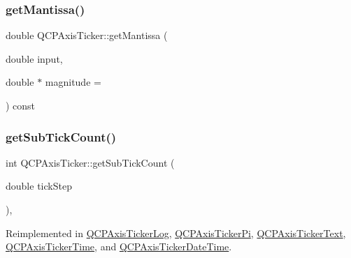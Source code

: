 \subsubsection{\texorpdfstring{get\+Mantissa()}{getMantissa()}}
{\footnotesize\ttfamily double Q\+C\+P\+Axis\+Ticker\+::get\+Mantissa (\begin{DoxyParamCaption}\item[{double}]{input,  }\item[{double $\ast$}]{magnitude = {} }\end{DoxyParamCaption}) const\hspace{0.3cm}{\ttfamily [protected]}}

\mbox{\label{class_q_c_p_axis_ticker_a4ccc403ced7a1457ce6ba293509933c8}} 
\subsubsection{\texorpdfstring{get\+Sub\+Tick\+Count()}{getSubTickCount()}}
{\footnotesize\ttfamily int Q\+C\+P\+Axis\+Ticker\+::get\+Sub\+Tick\+Count (\begin{DoxyParamCaption}\item[{double}]{tick\+Step }\end{DoxyParamCaption})\hspace{0.3cm}{\ttfamily [protected]}, {\ttfamily [virtual]}}



Reimplemented in \hyperlink{class_q_c_p_axis_ticker_log_a352fef7ae68837acd26e35188aa86167}{Q\+C\+P\+Axis\+Ticker\+Log}, \hyperlink{class_q_c_p_axis_ticker_pi_a56c90f870da97c8670cfae4d04ff3ac7}{Q\+C\+P\+Axis\+Ticker\+Pi}, \hyperlink{class_q_c_p_axis_ticker_text_a9c2488b877776870239abda4c8106052}{Q\+C\+P\+Axis\+Ticker\+Text}, \hyperlink{class_q_c_p_axis_ticker_time_acace84c46598176aa53837e147595471}{Q\+C\+P\+Axis\+Ticker\+Time}, and \hyperlink{class_q_c_p_axis_ticker_date_time_a78dece0d51426a3c310528d413e09193}{Q\+C\+P\+Axis\+Ticker\+Date\+Time}.

\mbox{\label{class_q_c_p_axis_ticker_a8201eb4aa8be192bf786b126eb5ee089}} 
